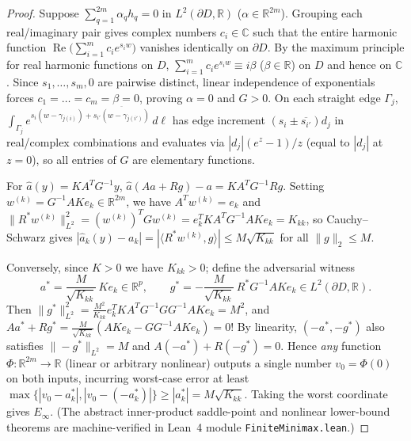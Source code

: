 \documentclass[11pt,reqno]{amsart}
\theoremstyle{definition}
\theoremstyle{remark}
\newcommand{\C}{\mathbb{C}}
\newcommand{\R}{\mathbb{R}}
\begin{document}
\begin{proof}
Suppose $\sum_{q=1}^{2m} \alpha_q h_q = 0$ in $L^2(\partial D, \R)$ ($\alpha \in \R^{2m}$). Grouping each real/imaginary pair gives complex numbers $c_i \in \C$ such that the entire harmonic function $\operatorname{Re}\bigl(\sum_{i=1}^m c_i e^{s_i w}\bigr)$ vanishes identically on $\partial D$. By the maximum principle for real harmonic functions on $D$, $\sum_{i=1}^m c_i e^{s_i w} \equiv i\beta$ ($\beta \in \R$) on $D$ and hence on $\C$. Since $s_1,\dots,s_m, 0$ are pairwise distinct, linear independence of exponentials forces $c_1 = \dots = c_m = \beta = 0$, proving $\alpha = 0$ and $G > 0$. On each straight edge $\Gamma_j$, $\int_{\Gamma_j} e^{s_i(w-\gamma_{j(i)}) + \overline{s_{i'}(w-\gamma_{j(i')})}}\,d\ell$ has edge increment $(s_i \pm \overline{s_{i'}}) d_j$ in real/complex combinations and evaluates via $|d_j|(e^z - 1)/z$ (equal to $|d_j|$ at $z = 0$), so all entries of $G$ are elementary functions.

For $\widehat a(y) = K A^T G^{-1} y$, $\widehat a(A a + R g) - a = K A^T G^{-1} R g$. Setting $w^{(k)} = G^{-1} A K e_k \in \R^{2m}$, we have $A^T w^{(k)} = e_k$ and $\|R^* w^{(k)}\|_{L^2}^2 = (w^{(k)})^T G w^{(k)} = e_k^T K A^T G^{-1} A K e_k = K_{kk}$, so Cauchy--Schwarz gives $|\widehat a_k(y) - a_k| = |\langle R^* w^{(k)}, g \rangle| \le M \sqrt{K_{kk}}$ for all $\|g\|_2 \le M$.

Conversely, since $K > 0$ we have $K_{kk} > 0$; define the adversarial witness
\[
  a^* = \frac{M}{\sqrt{K_{kk}}}\, K e_k \in \R^p, \qquad g^* = -\frac{M}{\sqrt{K_{kk}}}\, R^* G^{-1} A K e_k \in L^2(\partial D, \R).
\]
Then $\|g^*\|_{L^2}^2 = \frac{M^2}{K_{kk}} e_k^T K A^T G^{-1} G G^{-1} A K e_k = M^2$, and $A a^* + R g^* = \frac{M}{\sqrt{K_{kk}}}(A K e_k - G G^{-1} A K e_k) = 0$! By linearity, $(-a^*, -g^*)$ also satisfies $\|-g^*\|_{L^2} = M$ and $A(-a^*) + R(-g^*) = 0$. Hence \emph{any} function $\Phi : \R^{2m} \to \R$ (linear or arbitrary nonlinear) outputs a single number $v_0 = \Phi(0)$ on both inputs, incurring worst-case error at least $\max\{|v_0 - a_k^*|, |v_0 - (-a_k^*)|\} \ge |a_k^*| = M\sqrt{K_{kk}}$. Taking the worst coordinate gives $E_\infty$. (The abstract inner-product saddle-point and nonlinear lower-bound theorems are machine-verified in Lean~4 module \texttt{FiniteMinimax.lean}.)
\end{proof}
\end{document}
